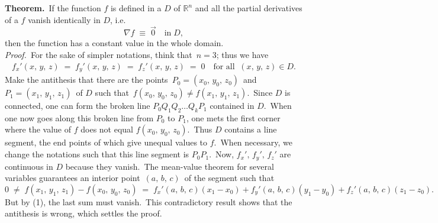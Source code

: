 \documentclass[12pt]{article}
\theoremstyle{definition}
\begin{document}

\textbf{Theorem.}\, If the function $f$ is defined in a  $D$ of $\mathbb{R}^n$ and all the partial derivatives of a $f$ vanish identically in $D$, i.e.
$$\nabla{f} \;\equiv\; \vec{0} \quad \mbox{in}\; D,$$
then the function has a constant value in the whole domain.\\

\emph{Proof.}\, For the sake of simpler notations, think that\, $n = 3$; thus we have
\begin{align}
f_x'(x,\,y,\,z) \;=\; f_y'(x,\,y,\,z) \;=\; f_z'(x,\,y,\,z) \;=\; 0 \quad \mbox{for all}\;\;(x,\,y,\,z) \in D.
\end{align}
Make the antithesis that there are the points \,$P_0 = (x_0,\,y_0,\,z_0)$\, and\, $P_1 = (x_1,\,y_1,\,z_1)$\, of $D$ such that\, 
$f(x_0,\,y_0,\,z_0) \neq f(x_1,\,y_1,\,z_1)$.\,
Since $D$ is connected, one can form the broken line $P_0Q_1Q_2\ldots Q_kP_1$ contained in $D$.\, When one now goes along this broken line from $P_0$ to $P_1$, one mets the first corner where the value of $f$ does not equal 
$f(x_0,\,y_0,\,z_0)$.\, Thus $D$ contains a line segment, the end points of which give unequal values to $f$.\, When necessary, we change the notations such that this line segment is $P_0P_1$.\, Now, $f_x',\,f_y',\,f_z'$ are continuous in $D$ because they vanish.\, The  mean-value theorem for several variables guarantees an interior point \,$(a,\,b,\,c)$\, of the segment such that
$$0 \;\neq\; f(x_1,\,y_1,\,z_1)-f(x_0,\,y_0,\,z_0) 
\;=\; f_x'(a,\,b,\,c)(x_1\!-\!x_0)+f_y'(a,\,b,\,c)(y_1\!-\!y_0)+f_z'(a,\,b,\,c)(z_1\!-\!z_0).$$
But by (1), the last sum must vanish.\, This contradictory result shows that the antithesis is wrong, which settles the proof.

\end{document}
